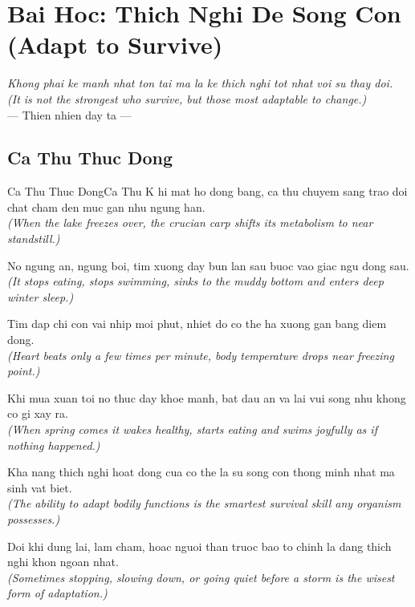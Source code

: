 \chapter{Bai Hoc: Thich Nghi De Song Con (Adapt to Survive)}
\begin{center}
  \textit{\color{truyenblue}Khong phai ke manh nhat ton tai ma la ke thich nghi tot nhat voi su thay doi.}\\
  \textit{(It is not the strongest who survive, but those most adaptable to change.)}\\[4pt]
  \small\color{truyengold}--- Thien nhien day ta ---
\end{center}
\ngancach

\section{Ca Thu Thuc Dong}
\begin{truyen}{Ca Thu Thuc Dong}{Ca Thu}
K hi mat ho dong bang, ca thu chuyem sang trao doi chat cham den muc gan nhu ngung han.\\
\textit{(When the lake freezes over, the crucian carp shifts its metabolism to near standstill.)}

No ngung an, ngung boi, tim xuong day bun lan sau buoc vao giac ngu dong sau.\\
\textit{(It stops eating, stops swimming, sinks to the muddy bottom and enters deep winter sleep.)}

Tim dap chi con vai nhip moi phut, nhiet do co the ha xuong gan bang diem dong.\\
\textit{(Heart beats only a few times per minute, body temperature drops near freezing point.)}

Khi mua xuan toi no thuc day khoe manh, bat dau an va lai vui song nhu khong co gi xay ra.\\
\textit{(When spring comes it wakes healthy, starts eating and swims joyfully as if nothing happened.)}

Kha nang thich nghi hoat dong cua co the la su song con thong minh nhat ma sinh vat biet.\\
\textit{(The ability to adapt bodily functions is the smartest survival skill any organism possesses.)}

\end{truyen}
\begin{baihoc}
  Doi khi dung lai, lam cham, hoac nguoi than truoc bao to chinh la dang thich nghi khon ngoan nhat.\\
  \textit{(Sometimes stopping, slowing down, or going quiet before a storm is the wisest form of adaptation.)}
\end{baihoc}

